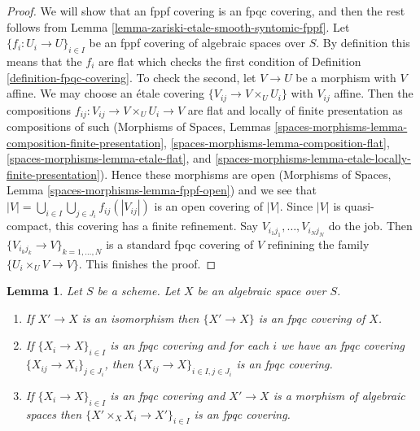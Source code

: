 \documentclass{stacks-project}
\theoremstyle{plain}
\newtheorem{lemma}[subsection]{Lemma}
\theoremstyle{definition}
\theoremstyle{remark}
\numberwithin{equation}{subsection}
\begin{document}
\begin{proof}
We will show that an fppf covering is an fpqc covering, and then the
rest follows from
Lemma \ref{lemma-zariski-etale-smooth-syntomic-fppf}.
Let $\{f_i : U_i \to U\}_{i \in I}$ be an
fppf covering of algebraic spaces over $S$.
By definition this means that the $f_i$ are flat which checks the first
condition of Definition \ref{definition-fpqc-covering}. To check the
second, let $V \to U$ be a morphism with $V$ affine.
We may choose an \'etale covering $\{V_{ij} \to V \times_U U_i\}$
with $V_{ij}$ affine. Then the compositions
$f_{ij} : V_{ij} \to V \times_U U_i \to V$ are flat and locally of
finite presentation as compositions of such
(Morphisms of Spaces, Lemmas
\ref{spaces-morphisms-lemma-composition-finite-presentation},
\ref{spaces-morphisms-lemma-composition-flat},
\ref{spaces-morphisms-lemma-etale-flat}, and
\ref{spaces-morphisms-lemma-etale-locally-finite-presentation}).
Hence these morphisms are open
(Morphisms of Spaces, Lemma \ref{spaces-morphisms-lemma-fppf-open})
and we see that
$|V| = \bigcup_{i \in I} \bigcup_{j \in J_i} f_{ij}(|V_{ij}|)$
is an open covering of $|V|$.
Since $|V|$ is quasi-compact, this covering has a finite
refinement.
Say $V_{i_1j_1}, \ldots, V_{i_Nj_N}$ do the job.
Then $\{V_{i_kj_k} \to V\}_{k = 1, \ldots, N}$ is
a standard fpqc covering of $V$ refinining the family
$\{U_i \times_U V \to V\}$.
This finishes the proof.
\end{proof}

\begin{lemma}
\label{lemma-fpqc}
Let $S$ be a scheme.
Let $X$ be an algebraic space over $S$.
\begin{enumerate}
\item If $X' \to X$ is an isomorphism then $\{X' \to X\}$
is an fpqc covering of $X$.
\item If $\{X_i \to X\}_{i\in I}$ is an fpqc covering and for each
$i$ we have an fpqc covering $\{X_{ij} \to X_i\}_{j\in J_i}$, then
$\{X_{ij} \to X\}_{i \in I, j\in J_i}$ is an fpqc covering.
\item If $\{X_i \to X\}_{i\in I}$ is an fpqc covering
and $X' \to X$ is a morphism of algebraic spaces then
$\{X' \times_X X_i \to X'\}_{i\in I}$ is an fpqc covering.
\end{enumerate}
\end{lemma}
\end{document}
